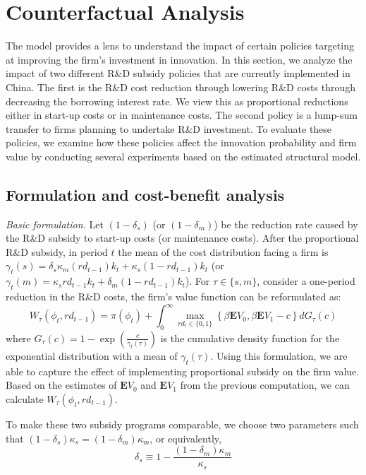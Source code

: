 \documentclass[11pt]{article}
\begin{document}
\section{Counterfactual Analysis}
 The model provides a lens to understand the impact of certain policies targeting at improving the firm's investment in innovation. In this section, we analyze the impact of two different R\&D subsidy policies that are currently implemented in China. The first is the R\&D cost reduction through lowering R\&D costs through decreasing the borrowing interest rate. We view this as proportional reductions either in start-up costs or in maintenance costs. The second policy is a lump-sum transfer to firms planning to undertake R\&D investment. To evaluate these policies, we examine how these policies affect the innovation probability and firm value by conducting several experiments based on the estimated structural model. 
 
\subsection{Formulation and cost-benefit analysis}  
\textit{Basic formulation.} Let $(1-\delta_s)$ (or $(1-\delta_m)$) be the reduction rate caused by the R\&D subsidy to start-up costs (or maintenance costs). After the proportional R\&D subsidy, in period $t$ the mean of the cost distribution facing a firm is $\gamma_t(s)=\delta_s\kappa_m (rd_{t-1}) k_t+\kappa_s(1- rd_{t-1}) k_t$ (or $\gamma_{t}(m)=\kappa_s rd_{t-1} k_t+\delta_m (1-rd_{t-1}) k_t$). For $\tau\in\{s,m\}$, consider a one-period reduction in the R\&D costs, the firm's value function can be reformulated as:
\begin{equation}\label{wz}  
W_{\tau}(\phi_t, rd_{t-1})=\pi(\phi_t)+ \int_0^{\infty}\max_{rd_t\in\{0,1\}}\left\{\beta \mathbf{E}V_{0},  \beta \mathbf{E}V_{1}-c\right\}dG_\tau(c)
\end{equation}
where $G_\tau(c)=1-\exp(\frac{c}{\gamma _t(\tau)})$ is the cumulative density function for the exponential distribution with a mean of $\gamma_t(\tau)$. Using this formulation, we are able to capture the effect of implementing proportional subsidy on the firm value. Based on the estimates of $\mathbf{E}V_{0}$ and  $\mathbf{E}V_1$ from the previous computation, we can calculate $W_{\tau}(\phi_t, rd_{t-1})$. 

To make these two subsidy programs comparable, we choose two parameters such that $(1-\delta_s)\kappa_s=(1-\delta_m)\kappa_m$, or equivalently, 
\begin{equation}
\delta_s\equiv 1-\frac{(1-\delta_m)\kappa_m}{\kappa_s}
\end{equation}
\end{document}
